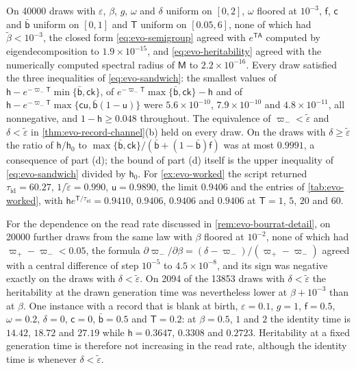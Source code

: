 \begin{numcheck}\label{chk:evo-heritability}
On 40000 draws with $\varepsilon$, $\beta$, $g$, $\omega$ and $\delta$ uniform on $[0,2]$, $\omega$ floored at $10^{-3}$, $\mathsf f$, $\mathsf c$ and $\bar{\mathsf b}$ uniform on $[0,1]$ and $\mathsf T$ uniform on $[0.05,6]$, none of which had $\tilde\beta<10^{-3}$, the closed form \eqref{eq:evo-semigroup} agreed with $e^{\mathsf T\mathsf A}$ computed by eigendecomposition to $1.9\times10^{-15}$, and \eqref{eq:evo-heritability} agreed with the numerically computed spectral radius of $\mathsf M$ to $2.2\times10^{-16}$. Every draw satisfied the three inequalities of \eqref{eq:evo-sandwich}: the smallest values of $\mathsf h-e^{-\varpi_-\mathsf T}\min\{\bar{\mathsf b},\mathsf c\mathsf k\}$, of $e^{-\varpi_-\mathsf T}\max\{\bar{\mathsf b},\mathsf c\mathsf k\}-\mathsf h$ and of $\mathsf h-e^{-\varpi_-\mathsf T}\max\{\mathsf c\mathsf u,\bar{\mathsf b}(1-\mathsf u)\}$ were $5.6\times10^{-10}$, $7.9\times10^{-10}$ and $4.8\times10^{-11}$, all nonnegative, and $1-\mathsf h\ge0.048$ throughout. The equivalence of $\varpi_-<\tilde\varepsilon$ and $\delta<\tilde\varepsilon$ in \cref{thm:evo-record-channel}(b) held on every draw. On the draws with $\delta\ge\tilde\varepsilon$ the ratio of $\mathsf h/\mathsf h_0$ to $\max\{\bar{\mathsf b},\mathsf c\mathsf k\}/(\bar{\mathsf b}+(1-\bar{\mathsf b})\mathsf f)$ was at most $0.9991$, a consequence of part (d); the bound of part (d) itself is the upper inequality of \eqref{eq:evo-sandwich} divided by $\mathsf h_0$. For \cref{ex:evo-worked} the script returned $\tau_{\mathrm{id}}=60.27$, $1/\tilde\varepsilon=0.990$, $\mathsf u=0.9890$, the limit $0.9406$ and the entries of \cref{tab:evo-worked}, with $\mathsf he^{\mathsf T/\tau_{\mathrm{id}}}=0.9410$, $0.9406$, $0.9406$ and $0.9406$ at $\mathsf T=1$, $5$, $20$ and $60$.

For the dependence on the read rate discussed in \cref{rem:evo-bourrat-detail}, on 20000 further draws from the same law with $\beta$ floored at $10^{-2}$, none of which had $\varpi_+-\varpi_-<0.05$, the formula $\partial\varpi_-/\partial\beta=(\delta-\varpi_-)/(\varpi_+-\varpi_-)$ agreed with a central difference of step $10^{-5}$ to $4.5\times10^{-8}$, and its sign was negative exactly on the draws with $\delta<\tilde\varepsilon$. On 2094 of the 13853 draws with $\delta<\tilde\varepsilon$ the heritability at the drawn generation time was nevertheless lower at $\beta+10^{-3}$ than at $\beta$. One instance with a record that is blank at birth, $\varepsilon=0.1$, $g=1$, $\mathsf f=0.5$, $\omega=0.2$, $\delta=0$, $\mathsf c=0$, $\bar{\mathsf b}=0.5$ and $\mathsf T=0.2$: at $\beta=0.5$, $1$ and $2$ the identity time is $14.42$, $18.72$ and $27.19$ while $\mathsf h=0.3647$, $0.3308$ and $0.2723$. Heritability at a fixed generation time is therefore not increasing in the read rate, although the identity time is whenever $\delta<\tilde\varepsilon$.


\end{numcheck}

